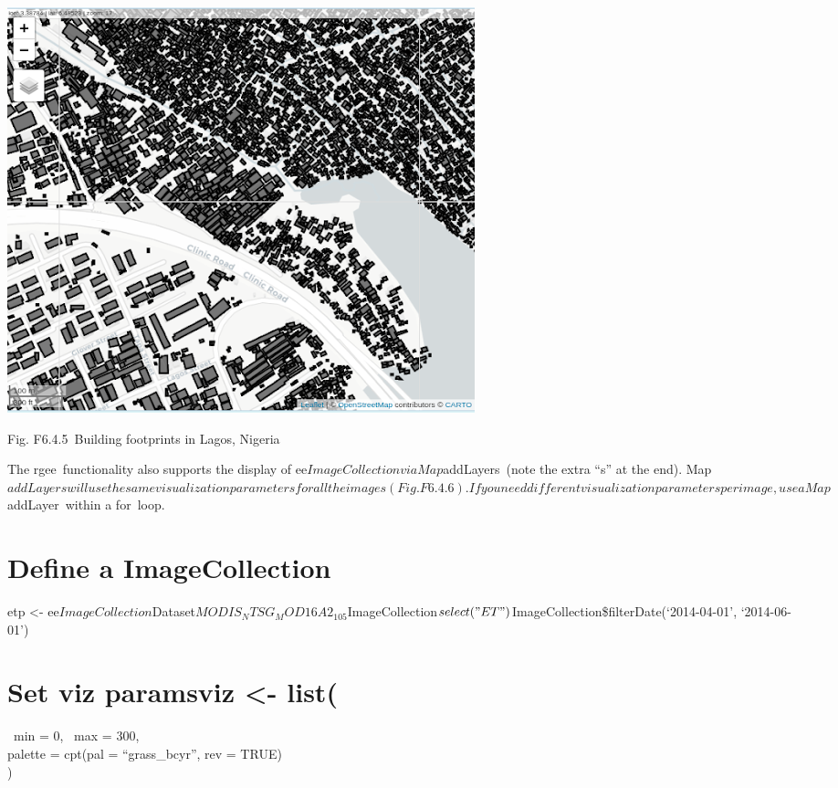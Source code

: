 \documentclass[
  letterpaper,
  DIV=11,
  numbers=noendperiod]{scrreprt}
\begin{document}
\includegraphics{./F6/image23.png}

Fig. F6.4.5~Building footprints in Lagos, Nigeria

The rgee~functionality also supports the display of
ee\(ImageCollection via Map\)addLayers~(note the extra ``s'' at the
end).
Map\(addLayers will use the same visualization parameters for all the images (Fig. F6.4.6). If you need different visualization parameters per image, use a Map\)addLayer~within
a for~loop.

\hypertarget{define-a-imagecollection}{%
\chapter{Define a ImageCollection}\label{define-a-imagecollection}}

etp \textless-
ee\(ImageCollection\)Dataset\(MODIS_NTSG_MOD16A2_105 %
\)ImageCollection\(select("ET") %
\)ImageCollection\$filterDate(`2014-04-01', `2014-06-01')

\hypertarget{set-viz-paramsviz---list}{%
\chapter{Set viz paramsviz \textless-
list(}\label{set-viz-paramsviz---list}}

~min = 0, ~max = 300,\\
\hspace*{0.333em}palette = cpt(pal = ``grass\_bcyr'', rev = TRUE)\\
)
\end{document}
